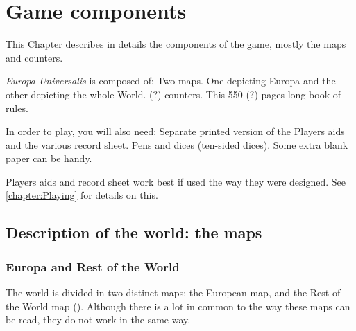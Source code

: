 



\chapter{Game components}\label{chapter:Basics}
\begin{designnote}
  This Chapter describes in details the components of the game, mostly the
  maps and counters.
\end{designnote}

\aparag \emph{Europa Universalis} is composed of:
\bparag Two maps. One depicting Europa and the other depicting the whole
World.
 (?) counters.
\bparag This 550 (?) pages long book of rules.

\aparag In order to play, you will also need:
\bparag Separate printed version of the Players aids and the various record
sheet.
\bparag Pens and dices (ten-sided dices).
\bparag Some extra blank paper can be handy.

\aparag Players aids and record sheet work best if used the way they were
designed. See \ref{chapter:Playing} for details on this.




\section{Description of the world: the maps}




\subsection{Europa and Rest of the World}

 The world is divided in two distinct maps: the European map,
and the Rest of the World map (\ROTW). Although there is a lot in common to
the way these maps can be read, they do not work in the same way.

